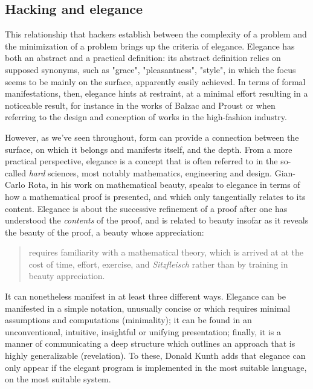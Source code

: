 \documentclass{article}
\begin{document}
\subsection{Hacking and elegance}

This relationship that hackers establish between the complexity of a problem and the minimization of a problem brings up the criteria of elegance. Elegance has both an abstract and a practical definition: its abstract definition relies on supposed synonyms, such as "grace", "pleasantness", "style", in which the focus seems to be mainly on the surface, apparently easily achieved. In terms of formal manifestations, then, elegance hints at restraint, at a minimal effort resulting in a noticeable result, for instance in the works of Balzac and Proust\cite{de_dieuleveult_les_2002} or when referring to the design and conception of works in the high-fashion industry.

However, as we've seen throughout, form can provide a connection between the surface, on which it belongs and manifests itself, and the depth. From a more practical perspective, elegance is a concept that is often referred to in the so-called \emph{hard} sciences, most notably mathematics, engineering and design. Gian-Carlo Rota, in his work on mathematical beauty, speaks to elegance in terms of how a mathematical proof is presented, and which only tangentially relates to its content\cite{rota_phenomenology_1997}. Elegance is about the successive refinement of a proof after one has understood the \emph{contents} of the proof, and is related to beauty insofar as it reveals the beauty of the proof, a beauty whose appreciation:

\begin{quote}
  requires familiarity with a mathematical theory, which is arrived at at the cost of time, effort, exercise, and \emph{Sitzfleisch} rather than by training in beauty appreciation.
\end{quote}

It can nonetheless manifest in at least three different ways. Elegance can be manifested in a simple notation, unusually concise or which requires minimal assumptions and computations (minimality); it can be found in an unconventional, intuitive, insightful or unifying presentation; finally, it is a manner of communicating a deep structure which outlines an approach that is highly generalizable (revelation). To these, Donald Kunth adds that elegance can only appear if the elegant program is implemented in the most suitable language, on the most suitable system\cite{knuth_literate_1992}.
\end{document}
